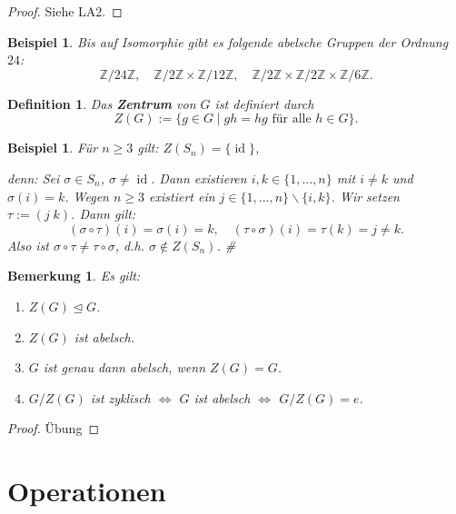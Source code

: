 \documentclass[a4paper, twoside, 11pt, ngerman]{report}
\newcommand{\ZZ}{\mathds Z}
\renewcommand{\setminus}{\smallsetminus}
\DeclareMathOperator{\ident}{id}
\theoremstyle{definistyle}
\newtheorem{defini}[satz]{Definition}
\newtheorem{bem}[satz]{Bemerkung}
\newtheorem{bsp}[satz]{Beispiel}
\theoremstyle{remark}
\newenvironment{denn}%
  {\par\textit{denn:}}%
  {\hfill\#\par}
\newcommand{\defn}[1]{\textit{\bfseries #1}}
\begin{document}
\begin{proof}
Siehe LA2.
\end{proof}

\begin{bsp}\label{bsp:abelsche_gruppen_ordnung_24}
Bis auf Isomorphie gibt es folgende abelsche Gruppen der Ordnung $24$:
\[
\ZZ / 24 \ZZ, \quad \ZZ / 2 \ZZ \times \ZZ / 12 \ZZ, \quad \ZZ / 2 \ZZ \times \ZZ / 2 \ZZ\times \ZZ / 6 \ZZ.
\]
\end{bsp}

\begin{defini}\label{defi:zentrum_einer_gruppe}
Das \defn{Zentrum} von $G$ ist definiert durch
\[
Z(G) := \{ g \in G \mid gh = hg \text{ für alle } h \in G \}.
\]
\end{defini}

\begin{bsp}\label{bsp:zentrum_symmetrische_gruppe}
Für $n \geq 3$ gilt: $Z(S_n) = \{\ident\}$,
\begin{denn}
Sei $\sigma \in S_n$, $\sigma \neq \ident$. Dann existieren $i, k \in \{1, \dots, n\}$ mit $i \neq k$ und $\sigma(i) = k$. 
Wegen $n \geq 3$ existiert ein $j \in \{1, \dots, n\} \setminus \{i, k\}$. Wir setzen $\tau := (j \; k)$. Dann gilt:
\[
(\sigma \circ \tau)(i) = \sigma(i) = k, \quad (\tau \circ \sigma)(i) = \tau(k) = j \neq k.
\]
Also ist $\sigma \circ \tau \neq \tau \circ \sigma$, d.h. $\sigma \notin Z(S_n)$.
\end{denn}
\end{bsp}


\begin{bem}\label{bem:zentrum_eigenschaften}
Es gilt:
\begin{enumerate}[label=(\alph*)]
    \item $Z(G) \trianglelefteq G$.
    \item $Z(G)$ ist abelsch.
    \item $G$ ist genau dann abelsch, wenn $Z(G) = G$.
    \item $G / Z(G)$ ist zyklisch $\iff$ $G$ ist abelsch $\iff$ $G / Z(G) = e$.
\end{enumerate}
\end{bem}

\begin{proof}
Übung
\end{proof}

\section{Operationen}
\end{document}
